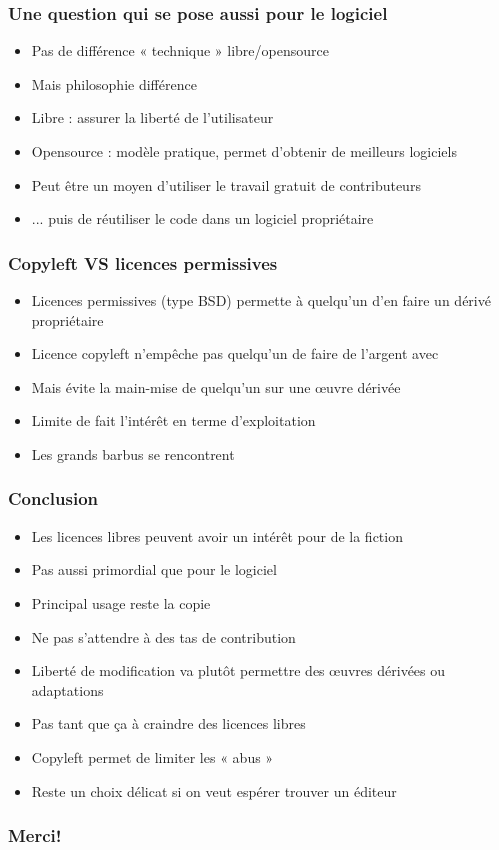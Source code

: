 \documentclass[11pt]{beamer}
\begin{document}
\begin{frame}
  \frametitle{Une question qui se pose aussi pour le logiciel}
    \begin{itemize}
    \item Pas de différence « technique » libre/opensource
    \item Mais philosophie différence
    \item Libre : assurer la liberté de l'utilisateur
    \item Opensource : modèle pratique, permet d'obtenir de meilleurs logiciels
    \item Peut être un moyen d'utiliser le travail gratuit de contributeurs
    \item ... puis de réutiliser le code dans un logiciel propriétaire
  \end{itemize}
\end{frame}

\begin{frame}
  \frametitle{Copyleft VS licences permissives}
  \begin{itemize}
  \item Licences permissives (type BSD) permette à quelqu'un d'en
    faire un dérivé propriétaire
  \item Licence copyleft n'empêche pas quelqu'un de faire de
      l'argent avec
    \item Mais évite la main-mise de quelqu'un sur une œuvre dérivée
    \item Limite de fait l'intérêt en terme d'exploitation
    \item Les grands barbus se rencontrent
  \end{itemize}
\end{frame}

\begin{frame}
  \frametitle{Conclusion}
  \begin{itemize}
  \item Les licences libres peuvent avoir un intérêt pour de la fiction
  \item Pas aussi primordial que pour le logiciel
  \item Principal usage reste la copie
  \item Ne pas s'attendre à des tas de contribution
  \item Liberté de modification va plutôt permettre des œuvres
    dérivées ou adaptations
  \item Pas tant que ça à craindre des licences libres
  \item Copyleft permet de limiter les « abus » 
  \item Reste un choix délicat si on veut espérer trouver un éditeur
  \end{itemize}
\end{frame}

\begin{frame}
  \frametitle{Merci!}
\end{frame}
\end{document}
